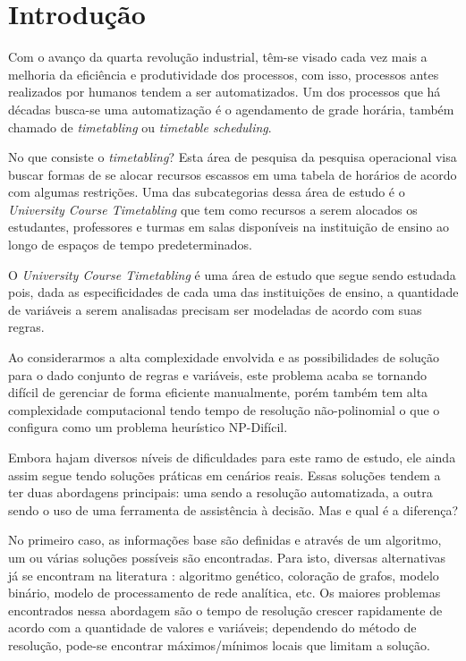 
\chapter[Introdução]{Introdução}

Com o avanço da quarta revolução industrial, têm-se visado cada vez mais a melhoria da eficiência e produtividade dos processos, com isso, processos antes realizados por humanos tendem a ser automatizados. Um dos processos que há décadas busca-se uma automatização é o agendamento de grade horária, também chamado de \textit{timetabling} ou \textit{timetable scheduling}.

No que consiste o \textit{timetabling}? Esta área de pesquisa da pesquisa operacional visa buscar formas de se alocar recursos escassos em uma tabela de horários de acordo com algumas restrições. Uma das subcategorias dessa área de estudo é o \textit{University Course Timetabling} que tem como recursos a serem alocados os estudantes, professores e turmas em salas disponíveis na instituição de ensino ao longo de espaços de tempo predeterminados.

O \textit{University Course Timetabling} é uma área de estudo que segue sendo estudada pois, dada as especificidades de cada uma das instituições de ensino, a quantidade de variáveis a serem analisadas precisam ser modeladas de acordo com suas regras.

Ao considerarmos a alta complexidade envolvida e as possibilidades de solução para o dado conjunto de regras e variáveis, este problema acaba se tornando difícil de gerenciar de forma eficiente manualmente, porém também tem alta complexidade computacional tendo tempo de resolução não-polinomial o que o configura como um problema heurístico NP-Difícil. \cite{MIRANDA2012505}

Embora hajam diversos níveis de dificuldades para este ramo de estudo, ele ainda assim segue tendo soluções práticas em cenários reais. \cite{MIRANDA2012505} Essas soluções tendem a ter duas abordagens principais: uma sendo a resolução automatizada, a outra sendo o uso de uma ferramenta de assistência à decisão. Mas e qual é a diferença?

No primeiro caso, as informações base são definidas e através de um algoritmo, um ou várias soluções possíveis são encontradas. Para isto, diversas alternativas já se encontram na literatura \cite{KADAM2016}: algoritmo genético, coloração de grafos, modelo binário, modelo de processamento de rede analítica, etc. Os maiores problemas encontrados nessa abordagem são o tempo de resolução crescer rapidamente de acordo com a quantidade de valores e variáveis; dependendo do método de resolução, pode-se encontrar máximos/mínimos locais que limitam a solução.

